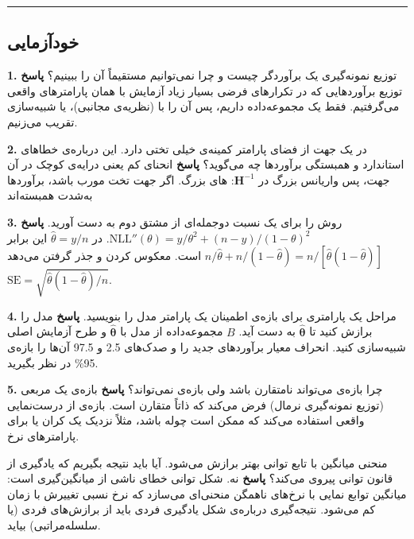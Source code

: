 \begin{center}\rule{0.5\linewidth}{0.5pt}\end{center}

\subsection{خودآزمایی}

\textbf{1.} توزیع نمونه‌گیری یک برآوردگر چیست و چرا نمی‌توانیم مستقیماً آن
را ببینیم؟ \textbf{پاسخ} توزیع برآوردهایی که در تکرارهای فرضی بسیار زیاد
آزمایش با همان پارامترهای واقعی می‌گرفتیم. فقط یک مجموعه‌داده داریم، پس آن
را با  (نظریه‌ی مجانبی)،  یا شبیه‌سازی
 تقریب می‌زنیم.

\textbf{2.}  در یک جهت از فضای پارامتر کمینه‌ی خیلی تختی دارد.
این درباره‌ی خطاهای استاندارد و همبستگی برآوردها چه می‌گوید؟ \textbf{پاسخ}
انحنای کم یعنی درایه‌ی کوچک  در آن جهت، پس واریانس بزرگ در
\(\mathbf{H}^{-1}\): های بزرگ. اگر جهت تخت مورب باشد، برآوردها
به‌شدت همبسته‌اند 

\textbf{3.}  روش  را برای یک نسبت دوجمله‌ای از مشتق دوم
 به دست آورید. \textbf{پاسخ}
\(\mathrm{NLL}''(\theta) = y/\theta^2 + (n-y)/(1-\theta)^2\). در
\(\hat\theta = y/n\) این برابر
\(n/\hat\theta + n/(1-\hat\theta) = n/[\hat\theta(1-\hat\theta)]\) است.
معکوس کردن و جذر گرفتن می‌دهد
\(\mathrm{SE} = \sqrt{\hat\theta(1-\hat\theta)/n}\).

\textbf{4.} مراحل یک  پارامتری برای بازه‌ی اطمینان یک
پارامتر مدل را بنویسید. \textbf{پاسخ} مدل را برازش کنید تا
\(\hat{\boldsymbol\theta}\) به دست آید. \(B\) مجموعه‌داده از مدل با
\(\hat{\boldsymbol\theta}\) و طرح آزمایش اصلی شبیه‌سازی کنید. انحراف
معیار برآوردهای جدید را  و صدک‌های 2.5 و 97.5 آن‌ها را بازه‌ی 95\%
در نظر بگیرید.

\textbf{5.} چرا بازه‌ی  می‌تواند نامتقارن باشد ولی
بازه‌ی  نمی‌تواند؟ \textbf{پاسخ} بازه‌ی  یک 
مربعی (توزیع نمونه‌گیری نرمال) فرض می‌کند که ذاتاً متقارن است. بازه‌ی
 از درست‌نمایی واقعی استفاده می‌کند که ممکن است چوله باشد،
مثلاً نزدیک یک کران یا برای پارامترهای نرخ.

منحنی میانگین با تابع توانی بهتر برازش می‌شود. آیا باید نتیجه بگیریم که
یادگیری از قانون توانی پیروی می‌کند؟ \textbf{پاسخ} نه. شکل توانی خطای
ناشی از میانگین‌گیری است: میانگین توابع نمایی با نرخ‌های ناهمگن منحنی‌ای
می‌سازد که نرخ نسبی تغییرش با زمان کم می‌شود. نتیجه‌گیری درباره‌ی شکل
یادگیری فردی باید از برازش‌های فردی (یا سلسله‌مراتبی) بیاید.

